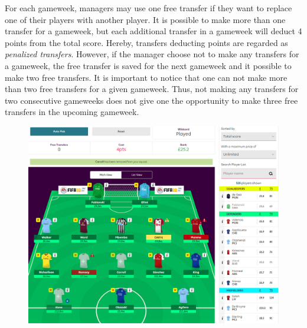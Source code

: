 \newpar

For each gameweek, managers may use one free transfer if they want to replace one of their players with another player. It is possible to make more than one transfer for a gameweek, but each additional transfer in a gameweek will deduct 4 points from the total score. Hereby, transfers deducting points are regarded as \textit{penalized transfers}. However, if the manager choose not to make any transfers for a gameweek, the free transfer is saved for the next gameweek and it possible to make two free transfers. It is important to notice that one can not make more than two free transfers for a given gameweek. Thus, not making any transfers for two consecutive gameweeks does not give one the opportunity to make three free transfers in the upcoming gameweek. 


\begin{figure}[H]
\centering
\includegraphics[scale=0.35]{fig/fantasyteam1.png}
\label{Figure_2.1}
\label{fig:fantasy_bilde}
\end{figure}

